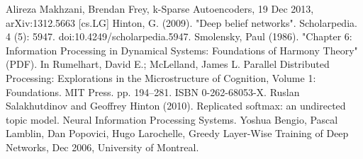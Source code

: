 \documentclass[12pt, a4paper]{report}
\begin{document}
\begin{thebibliography}{9}
Alireza Makhzani, Brendan Frey, k-Sparse Autoencoders, 19 Dec 2013, 	arXiv:1312.5663 [cs.LG]
Hinton, G. (2009). "Deep belief networks". Scholarpedia. 4 (5): 5947. doi:10.4249/scholarpedia.5947.
Smolensky, Paul (1986). "Chapter 6: Information Processing in Dynamical Systems: Foundations of Harmony Theory" (PDF). In Rumelhart, David E.; McLelland, James L. Parallel Distributed Processing: Explorations in the Microstructure of Cognition, Volume 1: Foundations. MIT Press. pp. 194–281. ISBN 0-262-68053-X.
Ruslan Salakhutdinov and Geoffrey Hinton (2010). Replicated softmax: an undirected topic model. Neural Information Processing Systems.
Yoshua Bengio, Pascal Lamblin, Dan Popovici, Hugo Larochelle, Greedy Layer-Wise Training of Deep Networks, Dec 2006, University of Montreal. 
\end{thebibliography}
\clearpage

\end{document}
